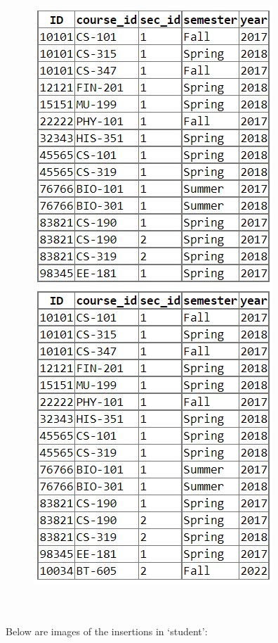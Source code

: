 \documentclass{article}
\begin{document}
\begin{figure}[!hbt]
    \centering
    \includegraphics[scale=0.82]{pics/insert-pic6.jpg}
    \label{fig:ins6}
\end{figure} \\ \\
Below are images of the insertions in `student':
\end{document}
